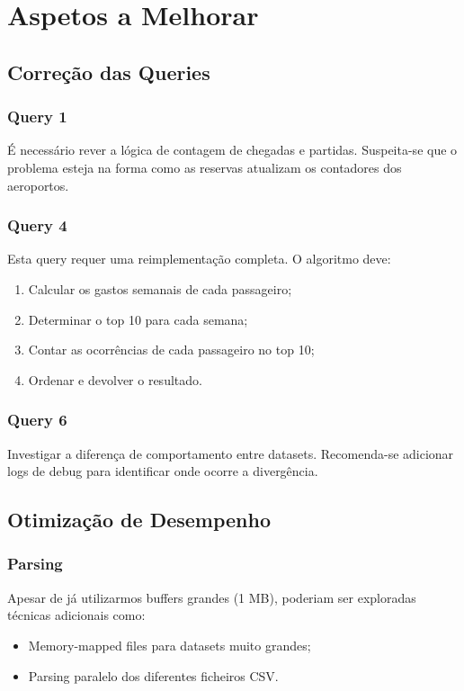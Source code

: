 \documentclass[a4paper,12pt]{scrreprt}
\begin{document}
\chapter{Aspetos a Melhorar}

\section{Correção das Queries}

\subsection{Query 1}

É necessário rever a lógica de contagem de chegadas e partidas. Suspeita-se que o problema esteja na forma como as reservas atualizam os contadores dos aeroportos.

\subsection{Query 4}

Esta query requer uma reimplementação completa. O algoritmo deve:
\begin{enumerate}
    \item Calcular os gastos semanais de cada passageiro;
    \item Determinar o top 10 para cada semana;
    \item Contar as ocorrências de cada passageiro no top 10;
    \item Ordenar e devolver o resultado.
\end{enumerate}

\subsection{Query 6}

Investigar a diferença de comportamento entre datasets. Recomenda-se adicionar logs de debug para identificar onde ocorre a divergência.

\section{Otimização de Desempenho}

\subsection{Parsing}

Apesar de já utilizarmos buffers grandes (1 MB), poderiam ser exploradas técnicas adicionais como:
\begin{itemize}
    \item Memory-mapped files para datasets muito grandes;
    \item Parsing paralelo dos diferentes ficheiros CSV.
\end{itemize}
\end{document}
